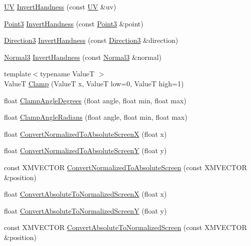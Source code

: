 \begin{DoxyCompactItemize}
\hyperlink{structmage_1_1_u_v}{UV} \hyperlink{namespacemage_a13b912f3dcd9c202fe3f9edb424e3b78}{Invert\+Handness} (const \hyperlink{structmage_1_1_u_v}{UV} \&uv)
\item 
\hyperlink{structmage_1_1_point3}{Point3} \hyperlink{namespacemage_a20ded71f51e2014bab8e7d232eaf1c29}{Invert\+Handness} (const \hyperlink{structmage_1_1_point3}{Point3} \&point)
\item 
\hyperlink{structmage_1_1_direction3}{Direction3} \hyperlink{namespacemage_a1d236e395736f7b5e28e52ccd3d643ae}{Invert\+Handness} (const \hyperlink{structmage_1_1_direction3}{Direction3} \&direction)
\item 
\hyperlink{structmage_1_1_normal3}{Normal3} \hyperlink{namespacemage_a437458a2e3278f106da66534c5218e4e}{Invert\+Handness} (const \hyperlink{structmage_1_1_normal3}{Normal3} \&normal)
\item 
{\footnotesize template$<$typename ValueT $>$ }\\ValueT \hyperlink{namespacemage_aa6dc8bc35accb3ccaac7ee60a5361754}{Clamp} (ValueT x, ValueT low=0, ValueT high=1)
\item 
float \hyperlink{namespacemage_a25d1197c5d3c86cc5d15e8225f796ac3}{Clamp\+Angle\+Degrees} (float angle, float min, float max)
\item 
float \hyperlink{namespacemage_ad538eb214c63b04ec6045e60791b814b}{Clamp\+Angle\+Radians} (float angle, float min, float max)
\item 
float \hyperlink{namespacemage_a2dbd3992e0bcb94b465ab4ab6b7d7f83}{Convert\+Normalized\+To\+Absolute\+ScreenX} (float x)
\item 
float \hyperlink{namespacemage_abc0e5fd9efdcd160a7c4e9b14c8ec7b6}{Convert\+Normalized\+To\+Absolute\+ScreenY} (float y)
\item 
const X\+M\+V\+E\+C\+T\+OR \hyperlink{namespacemage_a37cd57f31a66aac5355061bc3ad4e5ec}{Convert\+Normalized\+To\+Absolute\+Screen} (const X\+M\+V\+E\+C\+T\+OR \&position)
\item 
float \hyperlink{namespacemage_a7ad05dbf5e2b5d625daf57f43b26217f}{Convert\+Absolute\+To\+Normalized\+ScreenX} (float x)
\item 
float \hyperlink{namespacemage_a4300e91e448d76e1015cbc806c1d4467}{Convert\+Absolute\+To\+Normalized\+ScreenY} (float y)
\item 
const X\+M\+V\+E\+C\+T\+OR \hyperlink{namespacemage_add9fc09b8a7166c5e0d0bde63d8f2747}{Convert\+Absolute\+To\+Normalized\+Screen} (const X\+M\+V\+E\+C\+T\+OR \&position)
\item 

\end{DoxyCompactItemize}
